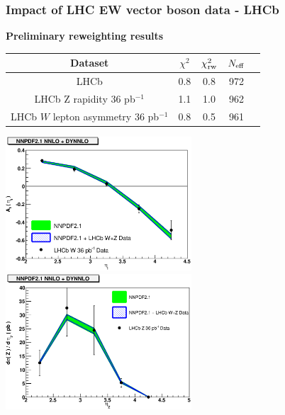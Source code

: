 \documentclass[10pt]{beamer}
\begin{document}
\begin{frame}
\frametitle{Impact of LHC EW vector boson data - LHCb}
\textbf{\footnotesize Preliminary reweighting results}
\begin{table}[h]
\scriptsize
\begin{center}
\begin{tabular}{|c|c|c|c|c|}
\hline
Dataset  &  $\chi^2$  &  $\chi^2_{\rm rw} $ & $N_{\rm eff}$  \\
\hline
\hline
LHCb   &   0.8 & 0.8   & 972    \\ 
\hline
LHCb Z rapidity 36 pb$^{-1}$      &  1.1  & 1.0  & 962   \\  
LHCb  $W$ lepton asymmetry 36 pb$^{-1}$      & 0.8   & 0.5  & 961   \\  
\hline
\end{tabular}
\end{center}
\end{table}
\begin{center}
\includegraphics[width=0.52\textwidth]{dat-th-lhcbw}
\includegraphics[width=0.52\textwidth]{dat-th-lhcbz}\\
\end{center}
\end{frame}
\end{document}
